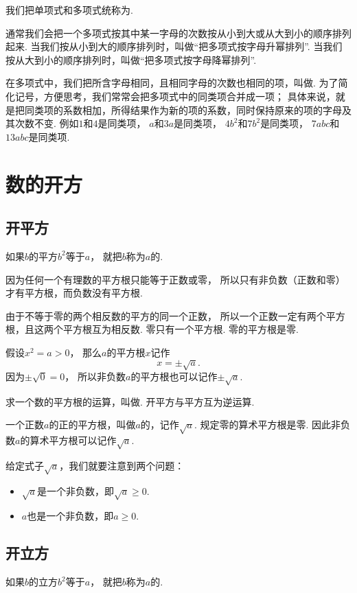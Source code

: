 我们把单项式和多项式统称为.

通常我们会把一个多项式按其中某一字母的次数按从小到大或从大到小的顺序排列起来.
当我们按从小到大的顺序排列时，叫做“把多项式按字母升幂排列”.
当我们按从大到小的顺序排列时，叫做“把多项式按字母降幂排列”.

在多项式中，我们把所含字母相同，且相同字母的次数也相同的项，叫做.
为了简化记号，方便思考，我们常常会把多项式中的同类项合并成一项；
具体来说，就是把同类项的系数相加，所得结果作为新的项的系数，同时保持原来的项的字母及其次数不变.
例如\(1\)和\(4\)是同类项，
\(a\)和\(3a\)是同类项，
\(4b^2\)和\(7b^2\)是同类项，
\(7abc\)和\(13abc\)是同类项.

\section{数的开方}
\subsection{开平方}
如果\(b\)的平方\(b^2\)等于\(a\)，
就把\(b\)称为\(a\)的.

因为任何一个有理数的平方根只能等于正数或零，
所以只有非负数（正数和零）才有平方根，而负数没有平方根.

由于不等于零的两个相反数的平方的同一个正数，
所以一个正数一定有两个平方根，且这两个平方根互为相反数.
零只有一个平方根.
零的平方根是零.

假设\(x^2 = a > 0\)，
那么\(a\)的平方根\(x\)记作\[
	x = \pm \sqrt{a}.
\]
因为\(\pm\sqrt0 = 0\)，
所以非负数\(a\)的平方根也可以记作\(\pm\sqrt{a}\).

求一个数的平方根的运算，叫做.
开平方与平方互为逆运算.

一个正数\(a\)的正的平方根，叫做\(a\)的，记作\(\sqrt{a}\).
规定零的算术平方根是零.
因此非负数\(a\)的算术平方根可以记作\(\sqrt{a}\).

给定式子\(\sqrt{a}\)，我们就要注意到两个问题：\begin{itemize}
	\item \(\sqrt{a}\)是一个非负数，即\(\sqrt{a}\geq0\).
	\item \(a\)也是一个非负数，即\(a\geq0\).
\end{itemize}

\subsection{开立方}
如果\(b\)的立方\(b^2\)等于\(a\)，
就把\(b\)称为\(a\)的.

